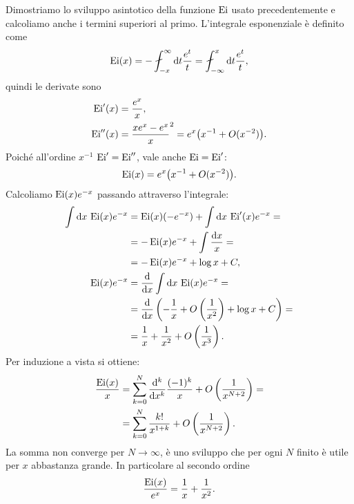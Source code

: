 Dimostriamo lo sviluppo asintotico della funzione $\operatorname{Ei}$ usato precedentemente
e calcoliamo anche i termini superiori al primo.
L'integrale esponenziale è definito come
\begin{equation*}
	\operatorname{Ei}(x)
	= -\fint_{-x}^\infty \de t \frac{e^t}t
	= \fint_{-\infty}^x \de t \frac{e^t}t,
\end{equation*}
quindi le derivate sono
\begin{align*}
	\operatorname{Ei}'(x) &= \frac{e^x}x, \\
	\operatorname{Ei}''(x) &= \frac{xe^x - e^x}x^2 = e^x \big(x^{-1} + O(x^{-2})\big).
\end{align*}
Poiché all'ordine $x^{-1}$ $\operatorname{Ei}'=\operatorname{Ei}''$, vale anche $\operatorname{Ei}=\operatorname{Ei}'$:
\begin{equation*}
	\operatorname{Ei}(x) = e^x \big(x^{-1} + O(x^{-2}) \big).
\end{equation*}
Calcoliamo $\operatorname{Ei}(x)e^{-x}$ passando attraverso l'integrale:
\begin{align*}
	\int\mathrm{d} x\, \operatorname{Ei}(x) e^{-x}
	&= \operatorname{Ei}(x)(-e^{-x}) + \int\mathrm{d} x\, \operatorname{Ei}'(x)e^{-x} = \\
	&= -\operatorname{Ei}(x)e^{-x}  + \int\frac{\mathrm{d} x}x = \\
	&= -\operatorname{Ei}(x)e^{-x} + \log x + C, \\
	\operatorname{Ei}(x)e^{-x}
	&= \frac{\mathrm{d} }{\mathrm{d} x} \int\mathrm{d} x\, \operatorname{Ei}(x)e^{-x} = \\
	&= \frac{\mathrm{d} }{\mathrm{d} x} \left( -\frac1x + O\left(\frac1{x^2}\right) + \log x + C \right) = \\
	&= \frac1x + \frac1{x^2} + O\left(\frac1{x^3}\right).
\end{align*}
Per induzione a vista si ottiene:
\begin{align*}
	\frac{\operatorname{Ei}(x)}x
	&= \sum_{k=0}^N \frac{\mathrm{d}^k}{\mathrm{d} x^k} \frac{(-1)^k}{x} + O\left(\frac1{x^{N+2}}\right) = \\
	&= \sum_{k=0}^N \frac{k!}{x^{1+k}} + O\left(\frac1{x^{N+2}}\right).
\end{align*}
La somma non converge per $N\to\infty$,
è uno sviluppo che per ogni $N$ finito è utile per $x$ abbastanza grande.
In particolare al secondo ordine
\begin{equation*}
	\frac{\operatorname{Ei}(x)}{e^x} = \frac1x + \frac1{x^2}.
\end{equation*}
